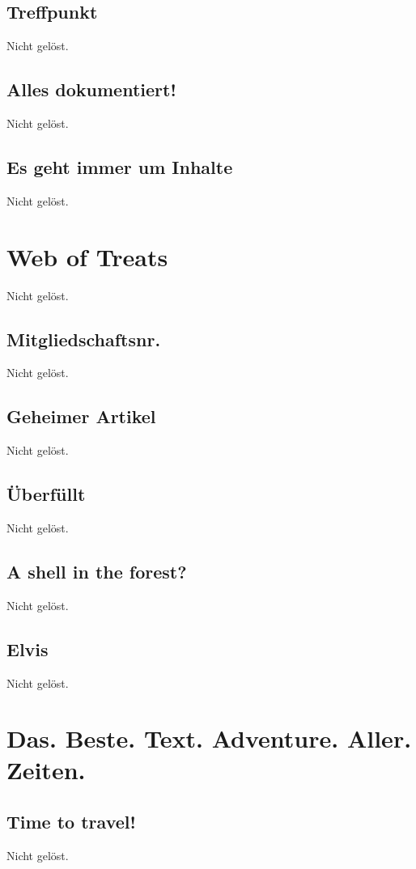 \documentclass[12pt, a4paper, titlepage, oneside]{scrartcl}
\begin{document}
	\subsection{Treffpunkt}
	Nicht gelöst.

	\subsection{Alles dokumentiert!}
	Nicht gelöst.

	\subsection{Es geht immer um Inhalte}
	Nicht gelöst.

	\section{Web of Treats}
	Nicht gelöst.

	\subsection{Mitgliedschaftsnr.}
	Nicht gelöst.

	\subsection{Geheimer Artikel}
	Nicht gelöst.

	\subsection{\"Uberf\"ullt}
	Nicht gelöst.

	\subsection{A shell in the forest?}
	Nicht gelöst.

	\subsection{Elvis}
	Nicht gelöst.

	\section{Das. Beste. Text. Adventure. Aller. Zeiten.}

	\subsection{Time to travel!}
	Nicht gelöst.
\end{document}
